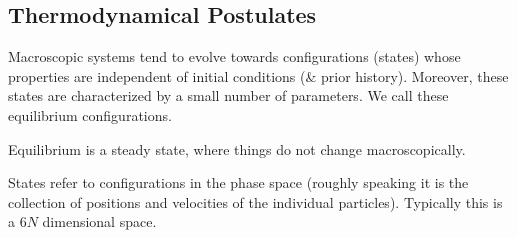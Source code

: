 \subsection{Thermodynamical Postulates}

 Macroscopic systems tend to evolve towards configurations (states) whose properties are independent of initial conditions (\& prior history). Moreover, these states are characterized by a small number of parameters. We call these equilibrium configurations.

Equilibrium is a steady state, where things do not change macroscopically.

States refer to configurations in the phase space (roughly speaking it is the collection of positions and velocities of the individual particles). Typically this is a $6N$ dimensional space. 